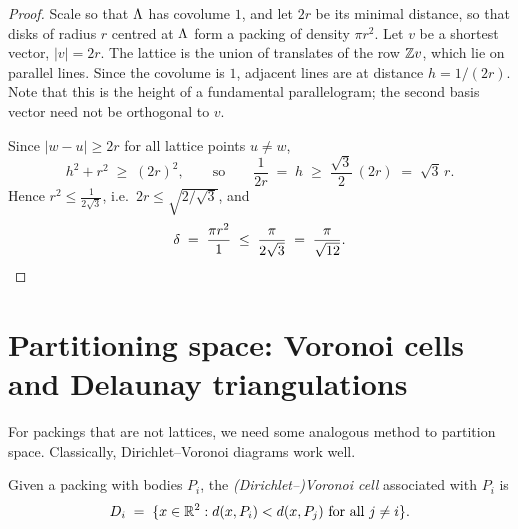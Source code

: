 \begin{proof}
Scale so that $\Lambda$ has covolume $1$, and let $2r$ be its minimal distance, so that disks of
radius $r$ centred at $\Lambda$ form a packing of density $\pi r^2$. Let $v$ be a shortest
vector, $|v|=2r$. The lattice is the union of translates of the row $\mathbb{Z} v$, which lie on
parallel lines. Since the covolume is $1$, adjacent lines are at distance $h=1/(2r)$.
Note that this is the height of a fundamental parallelogram; the second basis vector
need not be orthogonal to $v$.

\begin{center}
\end{center}

 Since $|w-u|\ge 2r$ for all lattice points $u\ne w$,
\[
  h^2+r^2\;\ge\;(2r)^2,\qquad\text{so}\qquad \frac1{2r}\;=\;h\;\ge\;\frac{\sqrt3}{2}\,(2r)\;=\;\sqrt3\,r .
\]
Hence $r^2\le \frac1{2\sqrt3}$, i.e.\ $2r\le\sqrt{2/\sqrt3}$, and
\[
  \delta\;=\;\frac{\pi r^2}{1}\;\le\;\frac{\pi}{2\sqrt3}\;=\;\frac{\pi}{\sqrt{12}} .
\]
\end{proof}

\section{Partitioning space: Voronoi cells and Delaunay triangulations}
\label{L1:sec:voronoi}

For packings that are not lattices, we need some analogous method to partition space.
Classically, Dirichlet--Voronoi diagrams work well.

\begin{definition}
\label{L1:def:voronoi}
Given a packing with bodies $P_i$, the \emph{(Dirichlet--)Voronoi cell} associated with $P_i$ is
\[
  D_i\;=\;\{x\in\mathbb{R}^2 : d(x,P_i)<d(x,P_j)\ \text{for all } j\neq i\}.
\]
\end{definition}

